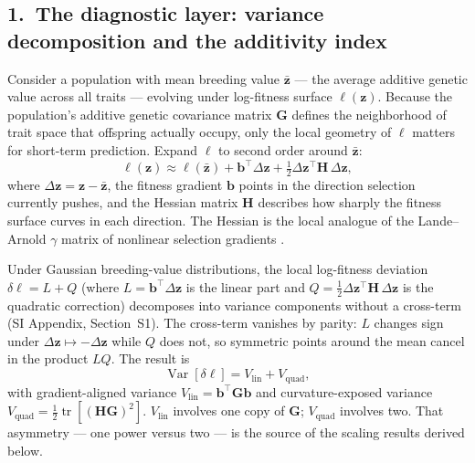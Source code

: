 \documentclass[9pt,twocolumn,twoside]{pnas-new}
\newcommand{\vect}[1]{\boldsymbol{#1}}
\newcommand{\mat}[1]{\mathbf{#1}}
\newcommand{\Vlin}{V_{\mathrm{lin}}}
\newcommand{\Vquad}{V_{\mathrm{quad}}}
\newcommand{\tr}{\operatorname{tr}}
\newcommand{\Var}{\operatorname{Var}}
\begin{document}
\subsection*{1.~The diagnostic layer: variance decomposition
             and the additivity index}

Consider a population with mean breeding value $\bar{\vect{z}}$
--- the average additive genetic value across all traits ---
evolving under log-fitness surface $\ell(\vect{z})$.
Because the population's additive genetic covariance matrix
$\mat{G}$ defines the neighborhood of trait space that offspring
actually occupy, only the local geometry of $\ell$ matters for
short-term prediction.
Expand $\ell$ to second order around $\bar{\vect{z}}$:
\begin{equation}
\ell(\vect{z})
\approx
\ell(\bar{\vect{z}})
+ \vect{b}^\top\!\Delta\vect{z}
+ \tfrac{1}{2}\Delta\vect{z}^\top\!\mat{H}\,\Delta\vect{z},
\label{eq:taylor}
\end{equation}
where $\Delta\vect{z} = \vect{z} - \bar{\vect{z}}$, the fitness
gradient $\vect{b}$ points in the direction selection currently
pushes, and the Hessian matrix $\mat{H}$ describes how sharply
the fitness surface curves in each direction.
The Hessian is the local analogue of the Lande--Arnold $\gamma$
matrix of nonlinear selection gradients
\cite{LandeArnold1983,PhillipsArnold1989}.

Under Gaussian breeding-value distributions, the local log-fitness
deviation $\delta\ell = L + Q$ (where $L = \vect{b}^\top\Delta\vect{z}$
is the linear part and $Q = \tfrac{1}{2}\Delta\vect{z}^\top
\mat{H}\,\Delta\vect{z}$ is the quadratic correction) decomposes
into variance components without a cross-term (SI Appendix,
Section~S1).
The cross-term vanishes by parity: $L$ changes sign under
$\Delta\vect{z}\mapsto-\Delta\vect{z}$ while $Q$ does not, so
symmetric points around the mean cancel in the product $LQ$.
The result is
\begin{equation}
\Var[\delta\ell] = \Vlin + \Vquad,
\label{eq:decomp}
\end{equation}
with gradient-aligned variance
$\Vlin = \vect{b}^\top\mat{G}\vect{b}$
and curvature-exposed variance
$\Vquad = \tfrac{1}{2}\tr[(\mat{H}\mat{G})^2]$.
$\Vlin$ involves one copy of $\mat{G}$; $\Vquad$ involves two.
That asymmetry --- one power versus two --- is the source of
the scaling results derived below.
\end{document}
